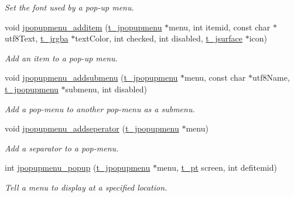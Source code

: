 \begin{DoxyCompactItemize}
\begin{DoxyCompactList}\small\item\em Set the font used by a pop-\/up menu. \item\end{DoxyCompactList}\item 
void \hyperlink{group__jpopupmenu_ga1911796fed5dd59d3ab9a7471f6161a9}{jpopupmenu\_\-additem} (\hyperlink{group__jgraphics_ga613e147be2f9655726f08f0896b9dbaa}{t\_\-jpopupmenu} $\ast$menu, int itemid, const char $\ast$utf8Text, \hyperlink{structt__jrgba}{t\_\-jrgba} $\ast$textColor, int checked, int disabled, \hyperlink{group__jsurface_ga9ced037ee8d6676fcd561e1d3420c28b}{t\_\-jsurface} $\ast$icon)
\begin{DoxyCompactList}\small\item\em Add an item to a pop-\/up menu. \item\end{DoxyCompactList}\item 
void \hyperlink{group__jpopupmenu_ga5ba90215f0693fe446f0f4c64af954b1}{jpopupmenu\_\-addsubmenu} (\hyperlink{group__jgraphics_ga613e147be2f9655726f08f0896b9dbaa}{t\_\-jpopupmenu} $\ast$menu, const char $\ast$utf8Name, \hyperlink{group__jgraphics_ga613e147be2f9655726f08f0896b9dbaa}{t\_\-jpopupmenu} $\ast$submenu, int disabled)
\begin{DoxyCompactList}\small\item\em Add a pop-\/menu to another pop-\/menu as a submenu. \item\end{DoxyCompactList}\item 
void \hyperlink{group__jpopupmenu_gad948b473c9ff12c1159960dcd36fb9a2}{jpopupmenu\_\-addseperator} (\hyperlink{group__jgraphics_ga613e147be2f9655726f08f0896b9dbaa}{t\_\-jpopupmenu} $\ast$menu)
\begin{DoxyCompactList}\small\item\em Add a separator to a pop-\/menu. \item\end{DoxyCompactList}\item 
int \hyperlink{group__jpopupmenu_ga53b05326e6d6f2def7573941d97699c0}{jpopupmenu\_\-popup} (\hyperlink{group__jgraphics_ga613e147be2f9655726f08f0896b9dbaa}{t\_\-jpopupmenu} $\ast$menu, \hyperlink{structt__pt}{t\_\-pt} screen, int defitemid)
\begin{DoxyCompactList}\small\item\em Tell a menu to display at a specified location. \item\end{DoxyCompactList}\item 

\end{DoxyCompactItemize}
